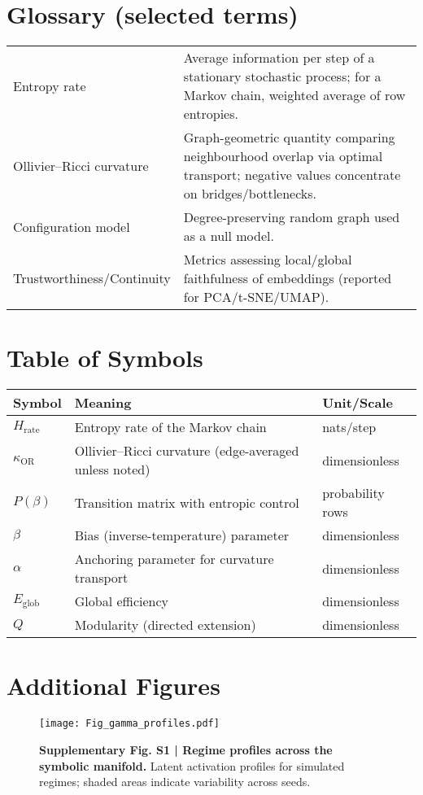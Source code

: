 \documentclass[10pt]{article}
\begin{document}
\section*{Glossary (selected terms)}
\begin{longtable}{@{}p{3cm}p{12cm}@{}}
\toprule
Entropy rate & Average information per step of a stationary stochastic process; for a Markov chain, weighted average of row entropies.\\[3pt]
Ollivier--Ricci curvature & Graph-geometric quantity comparing neighbourhood overlap via optimal transport; negative values concentrate on bridges/bottlenecks.\\[3pt]
Configuration model & Degree-preserving random graph used as a null model.\\[3pt]
Trustworthiness/Continuity & Metrics assessing local/global faithfulness of embeddings (reported for PCA/t-SNE/UMAP).\\
\bottomrule
\end{longtable}

\section*{Table of Symbols}
\begin{longtable}{@{}p{3cm}p{10cm}p{3cm}@{}}
\toprule
Symbol & Meaning & Unit/Scale\\ \midrule
$H_{\mathrm{rate}}$ & Entropy rate of the Markov chain & nats/step \\
$\kappa_{\mathrm{OR}}$ & Ollivier--Ricci curvature (edge-averaged unless noted) & dimensionless\\
$P(\beta)$ & Transition matrix with entropic control & probability rows\\
$\beta$ & Bias (inverse-temperature) parameter & dimensionless\\
$\alpha$ & Anchoring parameter for curvature transport & dimensionless\\
$E_{\mathrm{glob}}$ & Global efficiency & dimensionless\\
$Q$ & Modularity (directed extension) & dimensionless\\
\bottomrule
\end{longtable}

\section*{Additional Figures}

\begin{figure}[H]\centering
\texttt{[image: Fig\_gamma\_profiles.pdf]}
\caption{\textbf{Supplementary Fig. S1 | Regime profiles across the symbolic manifold.} Latent activation profiles for simulated regimes; shaded areas indicate variability across seeds.}
\end{figure}
\end{document}

